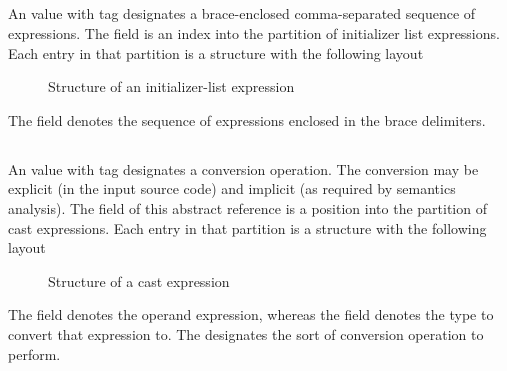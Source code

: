 
\subsection{}
\label{sec:ifc:ExprSort:InitializerList}

An  value with tag  designates a brace-enclosed comma-separated 
sequence of expressions.
The  field is an index into the partition of initializer list expressions.
Each entry in that partition is a structure with the following layout
%
\begin{figure}[H]
	\centering
	\caption{Structure of an initializer-list expression}
	\label{fig:ifc-initializer-list-structure}
\end{figure}
%
The  field denotes the sequence of expressions enclosed in the brace delimiters.




\subsection{}
\label{sec:ifc:ExprSort:Cast}

An  value with tag  designates a conversion operation.
The conversion may be explicit (in the input source code) and implicit (as required by semantics analysis).
The  field of this abstract reference  is a position into the partition of cast expressions.
Each entry in that partition is a structure with the following layout
%
\begin{figure}[H]
	\centering
	\caption{Structure of a cast expression}
	\label{fig:ifc:ExprSort:Cast}
\end{figure}
%
The  field denotes the operand expression, whereas the  field denotes
the type to convert that expression to.  The  designates the sort of conversion operation
to perform.

